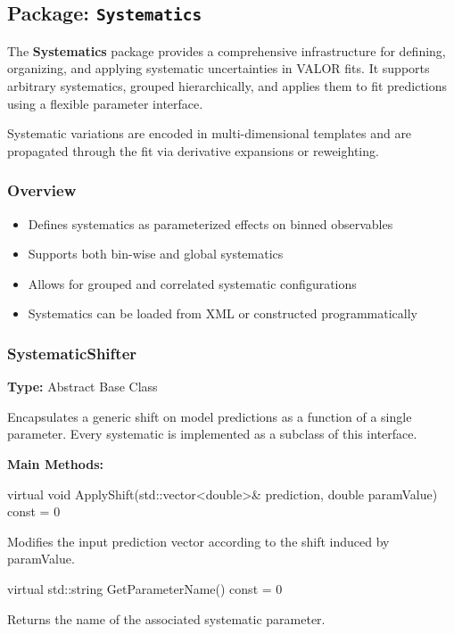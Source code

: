 %
%
%

\subsection{Package: \texttt{Systematics}}

The {\color{cadmiumgreen} \textbf{Systematics}} package provides a comprehensive infrastructure for defining, organizing, and applying systematic uncertainties in VALOR fits.  
It supports arbitrary systematics, grouped hierarchically, and applies them to fit predictions using a flexible parameter interface.

Systematic variations are encoded in multi-dimensional templates and are propagated through the fit via derivative expansions or reweighting.

\vspace{1em}
\subsubsection*{Overview}

\begin{itemize}
  \item Defines systematics as parameterized effects on binned observables
  \item Supports both bin-wise and global systematics
  \item Allows for grouped and correlated systematic configurations
  \item Systematics can be loaded from XML or constructed programmatically
\end{itemize}

\vspace{1em}
\subsubsection*{\color{cadmiumgreen}\bf SystematicShifter}

\textbf{Type:} Abstract Base Class

Encapsulates a generic shift on model predictions as a function of a single parameter.  
Every systematic is implemented as a subclass of this interface.

\vspace{0.5em}
\noindent\textbf{Main Methods:}

\begin{description}[align=left, labelsep=0.6em]

  \item[] {\color{cadmiumred} virtual void ApplyShift(std::vector<double>\& prediction, double paramValue) const = 0}

  Modifies the input {\color{amber}prediction} vector according to the shift induced by {\color{amber}paramValue}.

  \item[] {\color{cadmiumred} virtual std::string GetParameterName() const = 0}

  Returns the name of the associated systematic parameter.

\end{description}

